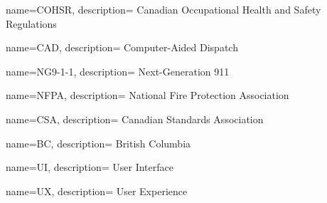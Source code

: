 {
  name={COHSR},
  description={
    Canadian Occupational Health and Safety Regulations
  }
}

{
  name={CAD},
  description={
    Computer-Aided Dispatch
  }
}

{
  name={NG9-1-1},
  description={
    Next-Generation 911
  }
}

{
  name={NFPA},
  description={
    National Fire Protection Association
  }
}

{
  name={CSA},
  description={
    Canadian Standards Association
  }
}

{
  name={BC},
  description={
    British Columbia
  }
}

{
  name={UI},
  description={
    User Interface
  }
}

{
  name={UX},
  description={
    User Experience
  }
}

